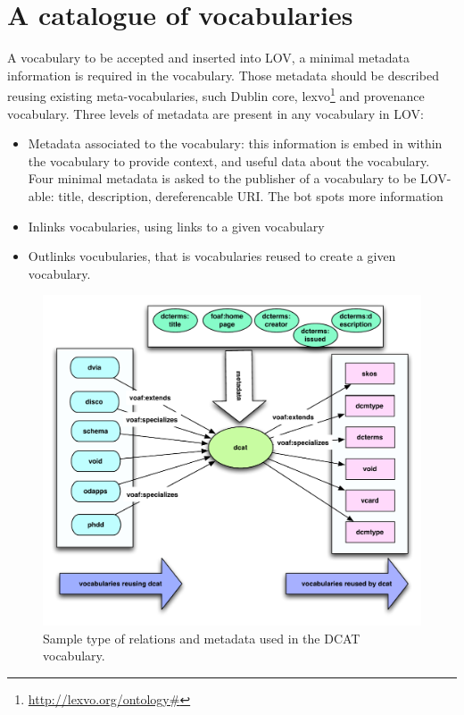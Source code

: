 \documentclass{iosart2c}
\begin{document}
\section{A catalogue of vocabularies}
\label{sec:metadata}
A vocabulary to be accepted and inserted into LOV, a minimal metadata information is required in the vocabulary. Those metadata should be described reusing existing meta-vocabularies, such Dublin core, lexvo\footnote{\url{http://lexvo.org/ontology#}} and provenance vocabulary.
Three levels of metadata are present in any vocabulary in LOV:
\begin{itemize}
\item Metadata associated to the vocabulary: this information is embed in within the vocabulary to provide context, and useful data about the vocabulary. Four minimal metadata is asked to the publisher of a vocabulary to be LOV-able: title, description, dereferencable URI. The bot spots more information 

\item Inlinks vocabularies, using links to a given vocabulary

\item Outlinks vocubularies, that is vocabularies reused to create a given vocabulary.  
\end{itemize}

\begin{figure}[ht!b]
\includegraphics[scale=0.4]{dcat-relations.pdf}
\caption{Sample type of relations and metadata used in the DCAT vocabulary.}
\label{fig:dcat}
\end{figure}
\end{document}

